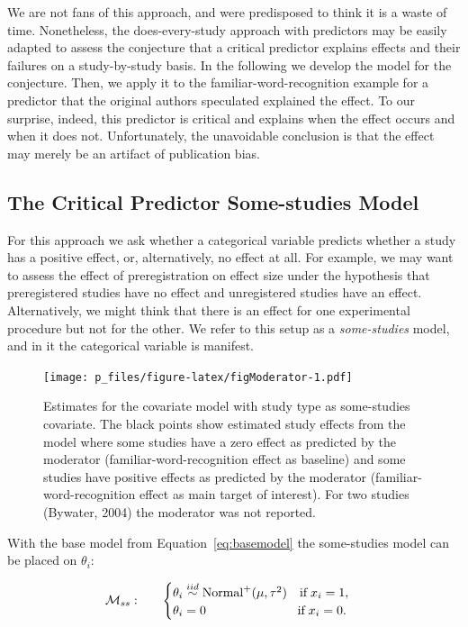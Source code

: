 \documentclass[english,,man]{apa6}
\begin{document}
We are not fans of this approach, and were predisposed to think it is a waste of time. Nonetheless, the does-every-study approach with predictors may be easily adapted to assess the conjecture that a critical predictor explains effects and their failures on a study-by-study basis. In the following we develop the model for the conjecture. Then, we apply it to the familiar-word-recognition example for a predictor that the original authors speculated explained the effect. To our surprise, indeed, this predictor is critical and explains when the effect occurs and when it does not. Unfortunately, the unavoidable conclusion is that the effect may merely be an artifact of publication bias.

\hypertarget{the-critical-predictor-some-studies-model}{%
\subsection{The Critical Predictor Some-studies Model}\label{the-critical-predictor-some-studies-model}}

For this approach we ask whether a categorical variable predicts whether a study has a positive effect, or, alternatively, no effect at all. For example, we may want to assess the effect of preregistration on effect size under the hypothesis that preregistered studies have no effect and unregistered studies have an effect. Alternatively, we might think that there is an effect for one experimental procedure but not for the other. We refer to this setup as a \emph{some-studies} model, and in it the categorical variable is manifest.

\begin{figure}
\centering
\texttt{[image: p\_files/figure-latex/figModerator-1.pdf]}
\caption{\label{fig:figModerator}Estimates for the covariate model with study type as some-studies covariate. The black points show estimated study effects from the model where some studies have a zero effect as predicted by the moderator (familiar-word-recognition effect as baseline) and some studies have positive effects as predicted by the moderator (familiar-word-recognition effect as main target of interest). For two studies (Bywater, 2004) the moderator was not reported.}
\end{figure}

With the base model from Equation~\eqref{eq:basemodel} the some-studies model can be placed on \(\theta_i\):

\[
\begin{array}{llr}
{\cal M}_{ss}: && \begin{cases}
\theta_i \stackrel{iid}{\sim} \mbox{Normal}^+(\mu,\tau^2) \quad \mbox{if} \; x_i = 1,\\
\theta_i = 0 \quad \quad \quad \quad \quad \quad \quad \; \mbox{if} \; x_i = 0.
\end{cases}
\end{array}
\]
\end{document}
